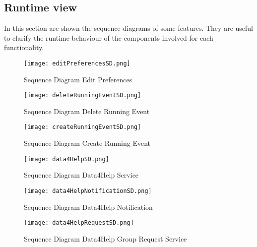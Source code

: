 \documentclass[../main.tex]{subfiles}
\begin{document}
\subsection{Runtime view}
In this section are shown the sequence diagrams of some features. They are useful to clarify the runtime behaviour of the components involved for each functionality.
\begin{figure}[H]
        \centering
             \texttt{[image: editPreferencesSD.png]}
              \caption{Sequence Diagram Edit Preferences }
               \label{fig:editPreferencesSD}
\end{figure}

\vspace*{2cm}

\begin{figure}[H]
        \centering
             \texttt{[image: deleteRunningEventSD.png]}
              \caption{Sequence Diagram Delete Running Event }
               \label{fig:deleteRunningEventSD}
\end{figure}

\vspace*{2cm}

\begin{figure}[H]
        \centering
             \texttt{[image: createRunningEventSD.png]}
              \caption{Sequence Diagram Create Running Event }
               \label{fig:createRunningEventSD}
\end{figure}

\vspace*{2cm}

\begin{figure}[H]
        \centering
             \texttt{[image: data4HelpSD.png]}
              \caption{Sequence Diagram Data4Help Service }
               \label{fig:data4HelpSD}
\end{figure}

\vspace*{2cm}

\begin{figure}[H]
        \centering
             \texttt{[image: data4HelpNotificationSD.png]}
              \caption{Sequence Diagram Data4Help Notification  }
               \label{fig:data4HelpSD}
\end{figure}

\vspace*{2cm}

\begin{figure}[H]
        \centering
             \texttt{[image: data4HelpRequestSD.png]}
              \caption{Sequence Diagram Data4Help Group Request Service }
               \label{fig:data4HelpRequestSD}
\end{figure}
\end{document}
